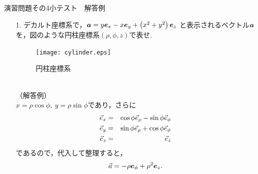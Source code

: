 \documentclass[11pt]{jarticle}
\def \vec#1{\mbox{\boldmath $#1$}} %
\begin{document}
\newpage
\begin{center}
{\Large
演習問題その4小テスト　解答例}\\
\end{center}
\begin{enumerate}
\item[1.]
デカルト座標系で，$\vec{a}=y \vec{e}_x - x \vec{e}_y + \left(x^2+y^2 \right) \vec{e}_z$
と表示されるベクトル$\vec{a}$を，図のような円柱座標系$(\rho,\phi,z)$で表せ.
\begin{figure}[h]
 \begin{center}
\texttt{[image: cylinder.eps]}\caption{円柱座標系}
\end{center}
\label{fig:1}
\end{figure}
\\
（解答例）\\
$x=\rho\cos\phi,\ y=\rho\sin\phi$であり，さらに
\begin{eqnarray*}
{\Vec e}_{\it x}&=&\cos\phi{\Vec e}_{\rho}-\sin\phi{\Vec e}_{\phi} \\
{\Vec e}_{\it y}&=&\sin\phi{\Vec e}_{\rho}+\cos\phi{\Vec e}_{\phi} \\
{\Vec e}_{\it z}&=&{\Vec e}_{\it z}
\end{eqnarray*}
であるので，代入して整理すると，
\begin{eqnarray*}
{\Vec a}= -\rho \vec{e}_{\phi}+ \rho^2 \vec{e}_z.
\end{eqnarray*}



\end{enumerate}
\end{document}
